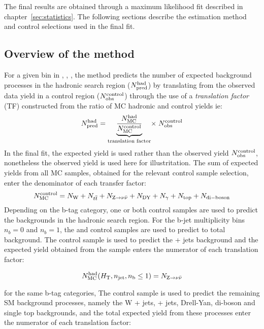 The final results are obtained through a maximum likelihood fit described
in chapter~\ref{sec:statistics}. The following sections describe 
the estimation method and control selections used in the final fit.

\subsection{Overview of the method\label{sec:background-method}}

For a given bin in \scalht, \njet, \nb, the method predicts the number 
of expected background processes in the hadronic search region ($N_{\textrm{pred}}^{\rm  had}$) 
by translating from the observed data yield in a control region 
($N_{\textrm{obs}}^{\rm  control}$) through the use of a {\it translation factor} 
(TF) constructed from the ratio of MC hadronic and control yields ie:
\begin{equation}
  \label{equ:pred-method}
  N_{\textrm{pred}}^{\rm had} = \underbrace{\frac{N_{\rm MC}^{\rm
      had}}{N_{\rm MC}^{\rm
      control}}}_\text{translation factor}\! \times \; N_{\textrm{obs}}^{\rm
    control}   
\end{equation}
In the ﬁnal ﬁt, the expected yield is used rather than the observed yield
$N_{\textrm{obs}}^{\rm  control}$, nonetheless the observed yield is used here for 
illustritation. The sum of expected yields from all MC samples, obtained for the
relevant control sample selection, enter the denominator of each
transfer factor:
\begin{equation}
  \label{equ:ratio-denom}
  N_{\rm MC}^{\rm control} = N_{\rm W} + N_{\relax{t}\overline{\relax{t}}} + N_{{\text Z} \rightarrow \nu\bar{\nu}} +
N_{\rm DY} + N_{\gamma} + N_{\rm top} + N_{\rm di-boson}
\end{equation}
Depending on the b-tag category, one or both control samples are used 
to predict the backgrounds in the hadronic search region. For the b-jet 
multiplicity bins $n_b = 0$ and $n_b = 1$, the \mj and \gj control samples 
are used to predict to total background. The \gj control
sample is used to predict the \znunu + jets background and the expected yield
obtained from the \znunu sample enters the numerator of each translation
factor:

\begin{equation}
  \label{equ:ratio-numer-gj}
  N_{\rm MC}^{\rm had}(\mbox{$H_\text{T}$},n_{\text{jet}},n_{\text{b}} \leq 1) = N_{{\text Z} \rightarrow \nu\bar{\nu}}
\end{equation}

for the same b-tag categories, The \mj control sample is used to predict 
the remaining SM background processes, namely the W + jets, \ttbar + jets,
Drell-Yan, di-boson and single top backgrounds, and the total expected yield
from these processes enter the numerator of each translation factor:

